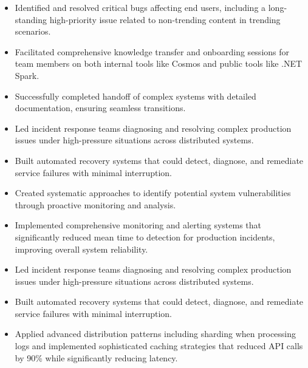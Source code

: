 \begin{itemize}
    \item \scriptsize{Identified and resolved critical bugs affecting end users, including a 
        long-standing high-priority issue related to non-trending content in trending scenarios.}
        
    \item \scriptsize{Facilitated comprehensive knowledge transfer and onboarding sessions for team 
        members on both internal tools like Cosmos and public tools like .NET Spark.}
        
    \item \scriptsize{Successfully completed handoff of complex systems with detailed documentation, 
        ensuring seamless transitions.}

    \item \scriptsize{Led incident response teams diagnosing and resolving complex production issues 
        under high-pressure situations across distributed systems.}
        
    \item \scriptsize{Built automated recovery systems that could detect, diagnose, and remediate 
        service failures with minimal interruption.}
        
    \item \scriptsize{Created systematic approaches to identify potential system vulnerabilities through 
        proactive monitoring and analysis.}
        
    \item \scriptsize{Implemented comprehensive monitoring and alerting systems that significantly 
        reduced mean time to detection for production incidents, improving overall system reliability.}

    \item \scriptsize{Led incident response teams diagnosing and resolving complex production issues 
        under high-pressure situations across distributed systems.}
        
    \item \scriptsize{Built automated recovery systems that could detect, diagnose, and remediate 
        service failures with minimal interruption.}
        
    \item \scriptsize{Applied advanced distribution patterns including sharding when processing logs and 
        implemented sophisticated caching strategies that reduced API calls by 90\% while significantly 
        reducing latency.}
        

\end{itemize}
